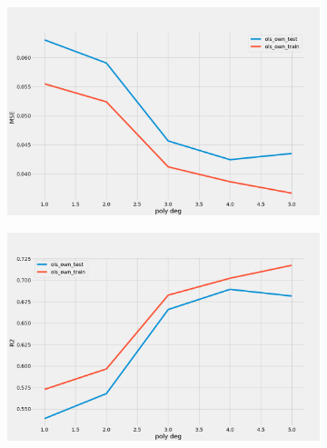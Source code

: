 \begin{figure}
     \centering
     \begin{subfigure}[b]{0.5\textwidth}
         \centering
         \includegraphics[width=\textwidth]{Figures/b_mse.png}
         \caption{}
         \label{fig:}
     \end{subfigure}%
     \hfill
     \begin{subfigure}[b]{0.5\textwidth}
         \centering
         \includegraphics[width=\textwidth]{Figures/b_r2.png}
         \caption{}
         \label{fig:}
     \end{subfigure}
        \caption{}
        \label{fig:}
\end{figure}






